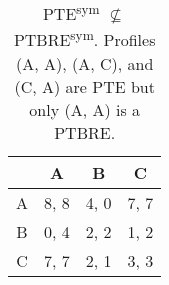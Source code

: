 \begin{table}
	\caption{
		PTE\textsuperscript{sym} $\not\subseteq$ PTBRE\textsuperscript{sym}.
		Profiles (A, A), (A, C), and (C, A) are PTE but only (A, A) is a PTBRE.
	}
	\label{tab:ties-pte-not-sub-ptbre}
	\centering
	\begin{tabular}{|c|c|c|c|}
		\hline
			& A		& B	   & C	  \\
		\hline
		A 		&\cellcolor{gray!00} 8, 8 &\cellcolor{gray!70} 4, 0 &\cellcolor{gray!00} 7, 7 \\
		\hline
		B		&\cellcolor{gray!70} 0, 4 &\cellcolor{gray!70} 2, 2 &\cellcolor{gray!70} 1, 2 \\
		\hline
		C		&\cellcolor{gray!00} 7, 7 &\cellcolor{gray!70} 2, 1 &\cellcolor{gray!70} 3, 3 \\
		\hline
	\end{tabular}
\end{table}


